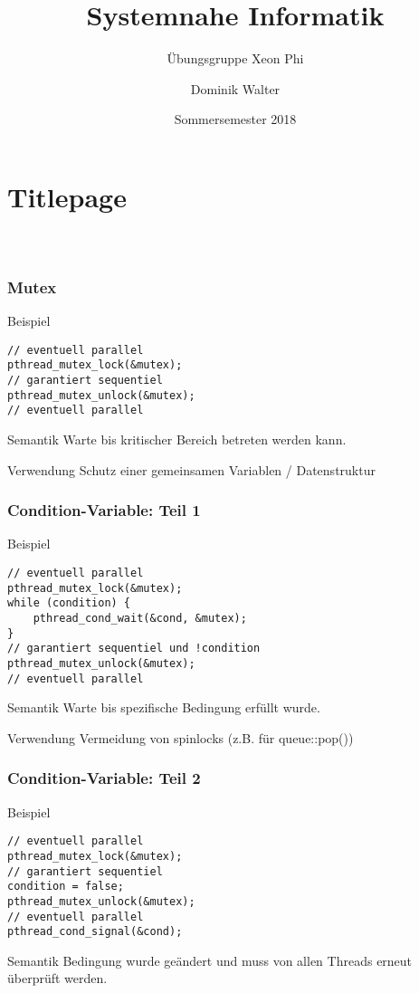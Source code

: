 \documentclass[xcolor=pdftex,dvipsnames,table]{beamer}
\title{Systemnahe Informatik}
\subtitle{Übungsgruppe Xeon Phi}
\author{Dominik Walter}
\date{Sommersemester 2018}
\begin{document}
\section*{Titlepage}
\begin{frame}
  \frametitle{\ }
  \titlepage
\end{frame}


\begin{frame}[fragile]
	\frametitle{Mutex}
	\begin{block}{Beispiel}
		\begin{lstlisting}	
// eventuell parallel
pthread_mutex_lock(&mutex);
// garantiert sequentiel
pthread_mutex_unlock(&mutex);
// eventuell parallel
		\end{lstlisting}
	\end{block}

	\begin{block}{Semantik}
		Warte bis kritischer Bereich betreten werden kann.
	\end{block}	

	\begin{block}{Verwendung}
		Schutz einer gemeinsamen Variablen / Datenstruktur
	\end{block}	
\end{frame}

\begin{frame}[fragile]
	\frametitle{Condition-Variable: Teil 1}
	\begin{block}{Beispiel}
		\begin{lstlisting}	
// eventuell parallel
pthread_mutex_lock(&mutex);
while (condition) {
	pthread_cond_wait(&cond, &mutex);
}
// garantiert sequentiel und !condition
pthread_mutex_unlock(&mutex);
// eventuell parallel
		\end{lstlisting}
	\end{block}
	
	\begin{block}{Semantik}
		Warte bis spezifische Bedingung erfüllt wurde.
	\end{block}	
	
	\begin{block}{Verwendung}
		Vermeidung von spinlocks (z.B. für queue::pop())
	\end{block}	
\end{frame}

\begin{frame}[fragile]
	\frametitle{Condition-Variable: Teil 2}
	\begin{block}{Beispiel}
		\begin{lstlisting}	
// eventuell parallel
pthread_mutex_lock(&mutex);
// garantiert sequentiel
condition = false;
pthread_mutex_unlock(&mutex);
// eventuell parallel
pthread_cond_signal(&cond);
		\end{lstlisting}
	\end{block}
	
	\begin{block}{Semantik}
		Bedingung wurde geändert und muss von allen Threads erneut überprüft werden.
	\end{block}	
\end{frame}
\end{document}
